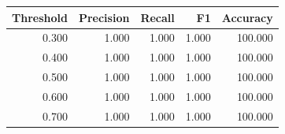 \begin{tabular}{rrrrr}
\toprule
Threshold & Precision & Recall & F1 & Accuracy \\
\midrule
0.300 & 1.000 & 1.000 & 1.000 & 100.000 \\
0.400 & 1.000 & 1.000 & 1.000 & 100.000 \\
0.500 & 1.000 & 1.000 & 1.000 & 100.000 \\
0.600 & 1.000 & 1.000 & 1.000 & 100.000 \\
0.700 & 1.000 & 1.000 & 1.000 & 100.000 \\
\bottomrule
\end{tabular}
